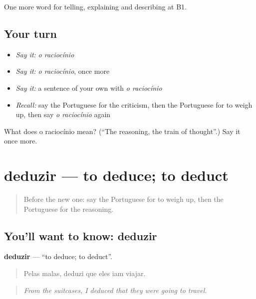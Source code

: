 \begin{grammarlens}[title={What you've built}]
One more word for telling, explaining and describing at B1.
\end{grammarlens}

\subsection*{Your turn}
\begin{itemize}
\raggedright
  \item \emph{Say it:} \emph{o raciocínio}
  \item \emph{Say it:} \emph{o raciocínio}, once more
  \item \emph{Say it:} a sentence of your own with \emph{o raciocínio}
  \item \emph{Recall:} say the Portuguese for the criticism, then the Portuguese for to weigh up, then say \emph{o raciocínio} again
\end{itemize}

\begin{tcolorbox}[breakable,colback=teal!4,colframe=teal!35!black,title={Before you move on}]
What does o raciocínio mean? (\textquotedblleft{}The reasoning, the train of thought\textquotedblright{}.) Say it once more.
\end{tcolorbox}
\section[deduzir]{deduzir — to deduce; to deduct}

\label{lesson:PT-C346-deduzir}



\begin{quote}
Before the new one: say the Portuguese for to weigh up, then the Portuguese for the reasoning.
\end{quote}

\subsection*{You'll want to know: deduzir}
\textbf{deduzir} — \textquotedblleft{}to deduce; to deduct\textquotedblright{}.

\begin{quote}
Pelas malas, deduzi que eles iam viajar.
\end{quote}

\begin{quote}
\emph{From the suitcases, I deduced that they were going to travel.}
\end{quote}

